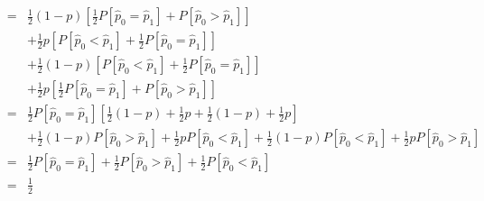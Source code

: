 \documentclass{article}
\begin{document}
\begin{eqnarray}
 &=& \frac{1}{2}(1-p)[\frac{1}{2} P[\hat{p}_0=\hat{p}_1] +P[\hat{p}_0>\hat{p}_1] ]
\\&& +\frac{1}{2}p [ P[\hat{p}_0<\hat{p}_1] + \frac{1}{2}P[\hat{p}_0=\hat{p}_1]]
\\&& + \frac{1}{2}(1-p)[ P[\hat{p}_0<\hat{p}_1] +\frac{1}{2}P[\hat{p}_0=\hat{p}_1]]
\\&& +\frac{1}{2}p [\frac{1}{2}P[\hat{p}_0=\hat{p}_1] +P[\hat{p}_0>\hat{p}_1] ]
\\
 &=& \frac{1}{2} P[\hat{p}_0=\hat{p}_1] [\frac{1}{2} (1-p) + \frac{1}{2}p + \frac{1}{2}(1-p) + \frac{1}{2}p]
\\&& +\frac{1}{2}(1-p)P[\hat{p}_0>\hat{p}_1]
 +\frac{1}{2}p P[\hat{p}_0<\hat{p}_1]
 + \frac{1}{2}(1-p) P[\hat{p}_0<\hat{p}_1]
 +\frac{1}{2}p P[\hat{p}_0>\hat{p}_1]
\\
 &=& \frac{1}{2} P[\hat{p}_0=\hat{p}_1] +\frac{1}{2}P[\hat{p}_0>\hat{p}_1] +\frac{1}{2} P[\hat{p}_0<\hat{p}_1]
\\
 &=& \frac{1}{2}
\end{eqnarray}
\end{document}
